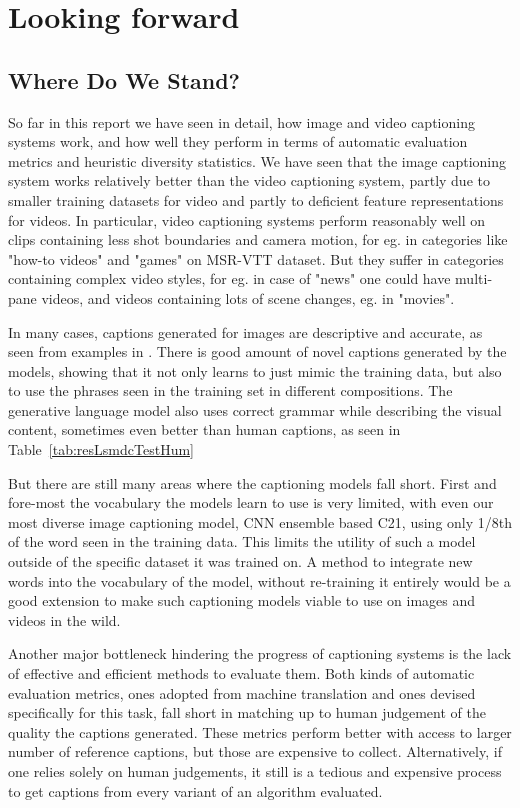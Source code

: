 \chapter{Looking forward}
\label{chapter:discussion}
\section{Where Do We Stand?}

So far in this report we have seen in detail, how image and video captioning
systems work, and how well they perform in terms of automatic evaluation
metrics and heuristic diversity statistics.
We have seen that the image captioning system works relatively better than the
video captioning system, partly due to smaller training datasets for video and
partly to deficient feature representations for videos.
In particular, video captioning systems perform reasonably well on clips
containing less shot boundaries and camera motion, for eg. in categories like
"how-to videos" and "games" on MSR-VTT dataset.
But they suffer in categories containing complex video styles, for eg. in case
of "news" one could have multi-pane videos, and videos containing lots of scene
changes, eg. in "movies".

In many cases, captions generated for images are descriptive and accurate, as
seen from examples in .
There is good amount of novel captions generated by the models, showing that it
not only learns to just mimic the training data, but also to use the phrases
seen in the training set in different compositions.
The generative language model also uses correct grammar while describing the
visual content, sometimes even better than human captions, as seen in
Table~\ref{tab:resLsmdcTestHum}

But there are still many areas where the captioning models fall short.
First and fore-most the vocabulary the models learn to use is very limited,
with even our most diverse image captioning model, CNN ensemble based C21,
using only 1/8th of the word seen in the training data. 
This limits the utility of such a model outside of the specific dataset it was
trained on.
A method to integrate new words into the vocabulary of the model, without
re-training it entirely would be a good extension to make such captioning
models viable to use on images and videos in the wild.

Another major bottleneck hindering the progress of captioning systems is the
lack of effective and efficient methods to evaluate them.
Both kinds of automatic evaluation metrics, ones adopted from machine
translation and ones devised specifically for this task, fall short in matching
up to human judgement of the quality the captions generated.
These metrics perform better with access to larger number of reference
captions, but those are expensive to collect.
Alternatively, if one relies solely on human judgements, it still is a tedious
and expensive process to get captions from every variant of an algorithm
evaluated.

